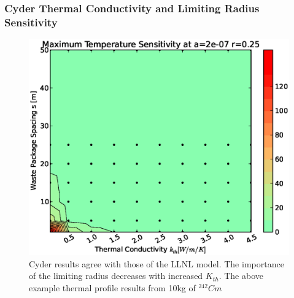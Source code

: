 \begin{frame}[ctb!]
\frametitle{Cyder Thermal Conductivity and Limiting Radius Sensitivity}

\begin{figure}[htbp!]
\begin{center}
\includegraphics[height=0.7\textheight]{./thermal_demonstration/conductivity/ks.eps}
\end{center}
\caption[$K_{th}$ vs. Waste Package Spacing Sensitivity in Cyder]{Cyder results agree with 
those of the LLNL model. The importance of the limiting radius decreases with 
increased $K_{th}$. The above example thermal profile results from 10kg of 
$^{242}Cm$}
\label{fig:ks}
\end{figure}
\end{frame}


